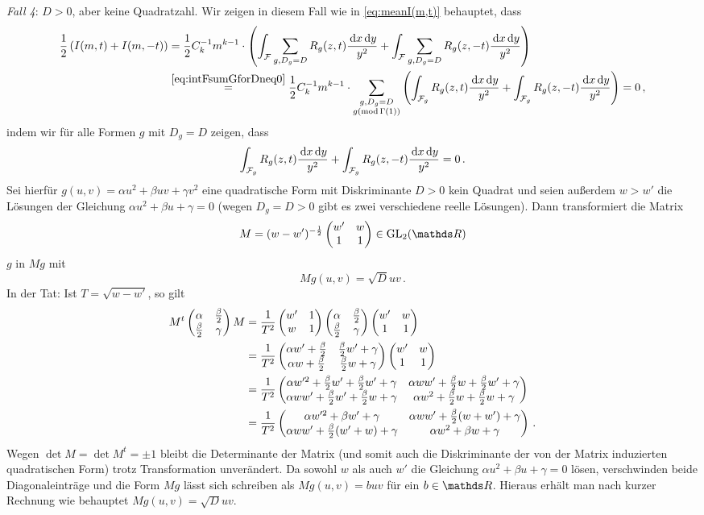 \begin{bewe}
\emph{Fall 4}: $D > 0$, aber keine Quadratzahl. Wir zeigen in diesem Fall wie in \eqref{eq:meanI(m,t)} behauptet, dass 
\begin{align*}
	\frac 12 \left( I(m,t) + I(m,-t) \right) 
	&= \frac 12 C_k^{-1} m^{k-1} \cdot \left( \int_{\mathcal{F}} \sum_{g, D_g = D} R_g(z,t) \frac {\,\mathrm{d} x \,\mathrm{d} y}{y^2} + \int_{\mathcal{F}} \sum_{g, D_g = D} R_g(z,-t) \frac {\,\mathrm{d} x \,\mathrm{d} y}{y^2} \right) \\
	& \overset{\eqref{eq:intFsumGforDneq0}}= \frac 12 C_k^{-1} m^{k-1} \cdot \sum_{\substack{g, D_g = D \\ g (\operatorname{mod} \Gamma(1))}} \left( \int_{\mathcal{F}_g} R_g (z,t) \frac{\,\mathrm{d} x \,\mathrm{d} y}{y^2} + \int_{\mathcal{F}_g} R_g (z,-t) \frac{\,\mathrm{d} x \,\mathrm{d} y}{y^2} \right)
	= 0
	\,,
\end{align*}
indem wir für alle Formen $g$ mit $D_g = D$ zeigen, dass
\[
	\int_{\mathcal{F}_g} R_g (z, t) \frac {\,\mathrm{d} x \,\mathrm{d} y}{y^2} + \int_{\mathcal{F}_g} R_g (z, -t) \frac {\,\mathrm{d} x \,\mathrm{d} y}{y^2} = 0
	\,.
\]
Sei hierfür $g(u, v) = \alpha u^2 + \beta uv + \gamma v^2$ eine quadratische Form mit Diskriminante $D > 0$ kein Quadrat und seien außerdem $w > w'$ die Lösungen der Gleichung $\alpha u^2 + \beta u + \gamma = 0$ (wegen $D_g = D > 0$ gibt es zwei verschiedene reelle Lösungen). Dann transformiert die Matrix
\[
	M = (w - w')^{- \frac 12} \mymat*{w'}w11 \in \GL_2(\RR)
\]
$g$ in $Mg$ mit
\[
	M g(u, v) = \sqrt{D} uv
	\,.
\]
In der Tat: Ist $T = \sqrt{w-w'}$, so gilt
\begin{align*}
	M^t \mymat*{\alpha}{\frac \beta 2}{\frac \beta 2}{\gamma} M 
	&= \frac{1}{T^2} \mymat*{w'}1w1 \mymat*{\alpha}{\frac \beta 2}{\frac \beta 2}{\gamma} \mymat*{w'}w11 \\
	&= \frac{1}{T^2} \mymat*{\alpha w' + \frac \beta 2}{\frac \beta 2 w' + \gamma}{\alpha w + \frac \beta 2}{\frac \beta 2 w + \gamma} \mymat*{w'}w11 \\
	&= \frac{1}{T^2} \mymat*{\alpha w'^2 + \frac \beta 2 w' + \frac \beta 2 w' + \gamma}{\alpha ww' + \frac \beta 2 w + \frac \beta 2 w' + \gamma}{\alpha ww' + \frac \beta 2 w' + \frac \beta 2 w + \gamma}{\alpha w^2 + \frac \beta 2 w + \frac \beta 2 w + \gamma} \\
	&= \frac{1}{T^2} \mymat*{\alpha w'^2 + \beta w' + \gamma}{\alpha ww' + \frac \beta 2 (w + w') + \gamma}{\alpha ww' + \frac \beta 2 (w' + w) + \gamma}{\alpha w^2 + \beta w + \gamma}
	\,.
\end{align*}
Wegen $\det M = \det M^t = \pm 1$ bleibt die Determinante der Matrix (und somit auch die Diskriminante der von der Matrix induzierten quadratischen Form) trotz Transformation unverändert. Da sowohl $w$ als auch $w'$ die Gleichung $\alpha u^2 + \beta u + \gamma = 0$ lösen, verschwinden beide Diagonaleinträge und die Form $Mg$ lässt sich schreiben als $Mg(u, v) = b uv$ für ein $b \in \RR$. Hieraus erhält man nach kurzer Rechnung wie behauptet $Mg(u, v) = \sqrt D uv$.


\end{bewe}

